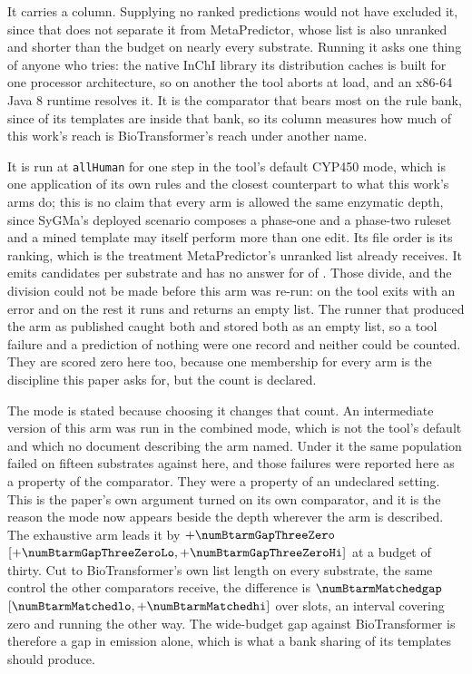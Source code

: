 \documentclass[journal=jcisd8,manuscript=suppinfo,layout=onecolumn]{achemso}
\begin{document}
It carries a column. Supplying no ranked predictions would not have excluded it, since that
does not separate it from MetaPredictor, whose list is also unranked and shorter than the budget on
nearly every substrate. Running it asks one thing of anyone who tries: the
native InChI library its distribution caches is built for one processor architecture, so on
another the tool aborts at load, and an x86-64 Java 8 runtime resolves it. It is the comparator that
bears most on the rule bank, since \numThirdpartyBiotransformerShipped{} of its templates
are inside that bank, so its column measures how much of this work's reach is BioTransformer's
reach under another name.

It is run at \texttt{allHuman} for one step in the tool's default CYP450 mode, which is one
application of its own rules and the
closest counterpart to what this work's arms do; this is no claim that every arm is allowed the
same enzymatic depth, since SyGMa's deployed scenario composes a phase-one and a phase-two ruleset
and a mined template may itself perform more than one edit. Its file order is its ranking, which
is the treatment MetaPredictor's unranked list already receives. It emits \numBtarmEmitted{}
candidates per substrate and has no answer for \numBtarmSilent{} of \numPopulationN{}. Those divide, and
the division could not be made before this arm was re-run: on \numBtstepsCrashes{} the tool exits
with an error and on the rest it runs and returns an empty list. The runner that produced the arm
as published caught both and stored both as an empty list, so a tool failure and a prediction of
nothing were one record and neither could be counted. They are scored zero here too, because one
membership for every arm is the discipline this paper asks for, but the count is declared.

The mode is stated because choosing it changes that count. An intermediate version of this arm was
run in the combined mode, which is not the tool's default and which no document describing the arm
named. Under it the same population failed on fifteen substrates against
\numBtstepsCrashes{} here, and those failures were reported here as a property of the comparator. They
were a property of an undeclared setting. This is the paper's own argument turned on its own
comparator, and it is the reason the mode now appears beside the depth wherever the arm is
described. The exhaustive arm
leads it by $+\numBtarmGapThreeZero$ $[+\numBtarmGapThreeZeroLo, +\numBtarmGapThreeZeroHi]$ at a
budget of thirty. Cut to BioTransformer's own list length on every substrate, the same control the
other comparators receive, the difference is $\numBtarmMatchedgap$ $[\numBtarmMatchedlo,
+\numBtarmMatchedhi]$ over \numBtarmMatchedslots{} slots, an interval covering zero and running
the other way. The wide-budget gap against BioTransformer is therefore a gap in emission alone,
which is what a bank sharing \numThirdpartyBiotransformerShipped{} of its templates should produce.
\end{document}
